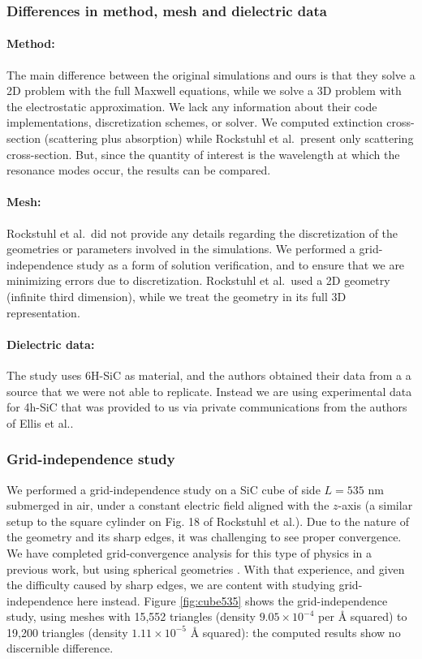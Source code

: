 \subsubsection{Differences in method, mesh and dielectric data}

\paragraph{Method:} The main difference between the original simulations and ours is that they solve a 2D problem with the 
full Maxwell equations, while we solve a 3D problem with the electrostatic approximation. 
We lack any information about their code implementations, discretization schemes, or solver.  
We computed extinction cross-section (scattering plus absorption) while Rockstuhl et al.\ present only scattering cross-section. 
But, since the quantity of interest is the wavelength at which the resonance modes occur, the results can be compared.

\paragraph{Mesh:} Rockstuhl et al.\ did not provide any details regarding the discretization of the geometries or 
parameters involved in the simulations.
We performed a grid-independence study as a form of solution verification, and to ensure that we are 
minimizing errors due to discretization. Rockstuhl et al.\ used a 2D geometry (infinite third dimension), while we treat the geometry in its full 3D representation.

\paragraph{Dielectric data:} The study uses 6H-SiC as material, and the authors obtained their data from a a source that we
were not able to replicate. Instead we are using experimental data for 4h-SiC that was provided to us 
via private communications from the authors of Ellis et al.\cite{ellis2016}.  

\subsubsection{Grid-independence study}\label{sec:independence}

We performed a grid-independence study on a SiC cube of side $L=535$ nm submerged in air, under a 
constant electric field aligned with the $z$-axis (a similar setup to the square cylinder on Fig. 18 of 
Rockstuhl et al.\cite{rockstuhl2005}). 
Due to the nature of the geometry and its sharp edges, it was challenging to see proper convergence. 
We have completed grid-convergence analysis for this type of physics in a previous work, but using spherical geometries \cite{ClementiETal2019}. 
With that experience, and given the difficulty caused by sharp edges, we are content with studying grid-independence here instead.
Figure \ref{fig:cube535} shows the grid-independence study, using meshes with  15,552 triangles (density $9.05\times10^{-4}$ per $\text{\AA}$ squared)
 to 19,200 triangles (density $1.11\times10^{-5}$ $\text{\AA}$ squared):
 the computed results show no discernible difference.

